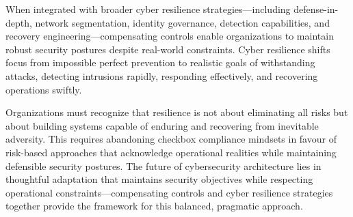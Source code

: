 \documentclass[sigconf,nonacm]{acmart}
\begin{document}
When integrated with broader cyber resilience strategies---including defense-in-depth,
network segmentation, identity governance, detection capabilities, and recovery
engineering---compensating controls enable organizations to maintain robust security
postures despite real-world constraints. Cyber resilience shifts focus from impossible
perfect prevention to realistic goals of withstanding attacks, detecting intrusions
rapidly, responding effectively, and recovering operations swiftly.

Organizations must recognize that resilience is not about eliminating all risks but about
building systems capable of enduring and recovering from inevitable adversity. This
requires abandoning checkbox compliance mindsets in favour of risk-based approaches that
acknowledge operational realities while maintaining defensible security postures. The
future of cybersecurity architecture lies in thoughtful adaptation that maintains
security objectives while respecting operational constraints---compensating controls and
cyber resilience strategies together provide the framework for this balanced, pragmatic
approach.
\end{document}
